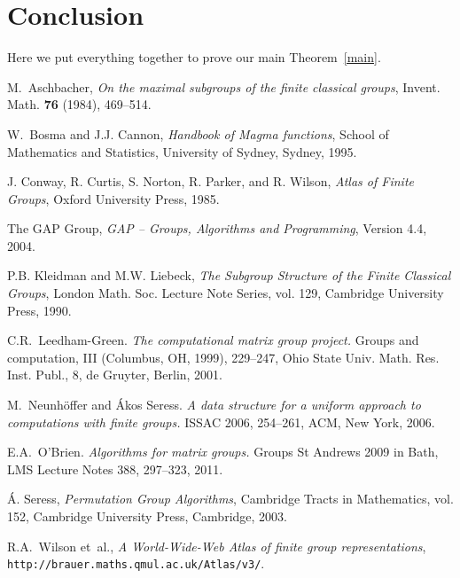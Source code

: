 \documentclass[a4paper,11pt]{article}
\begin{document}
\section{Conclusion}

Here we put everything together to prove our main Theorem~\ref{main}.

\begin{thebibliography}{999}

M.~Aschbacher, \emph{On the maximal subgroups of the finite classical groups},
  Invent. Math. \textbf{76} (1984), 469--514.
  
W.~Bosma and J.J. Cannon, \emph{Handbook of {{\sc Magma}} functions}, School of
  Mathematics and Statistics, University of Sydney, Sydney, 1995.

J. Conway, R. Curtis, S. Norton, R. Parker, and R. Wilson, \emph{Atlas of
  {F}inite {G}roups}, Oxford University Press, 1985.
  
The {GAP} Group, \emph{{GAP} -- {G}roups, {A}lgorithms and {P}rogramming}, Version 4.4, 2004.

P.B. Kleidman and M.W. Liebeck, \emph{The {S}ubgroup {S}tructure of the
  {F}inite {C}lassical {G}roups}, London Math. Soc. Lecture Note Series, vol.
  129, Cambridge University Press, 1990.

C.R.~Leedham-Green. \emph{The computational matrix group project.}
  Groups and computation, III (Columbus, OH, 1999), 229--247, 
  Ohio State Univ. Math. Res. Inst. Publ., 8, de Gruyter, Berlin, 2001.

M.~Neunh{\"o}ffer and {\'A}kos Seress.
  \emph{A data structure for a uniform approach to computations with finite 
  groups.} ISSAC 2006, 254--261, ACM, New York, 2006. 

E.A.~O'Brien. \emph{Algorithms for matrix groups.}
    Groups St Andrews 2009 in Bath, LMS Lecture Notes 388, 297--323, 2011.

{\'A}. Seress, \emph{Permutation {G}roup {A}lgorithms}, Cambridge
  Tracts in Mathematics, vol. 152, Cambridge University Press, Cambridge, 2003.
  
R.A.~Wilson et~al., \emph{A {W}orld-{W}ide-{W}eb {A}tlas of finite group
  representations}, {\texttt{http://brauer.maths.qmul.ac.uk/Atlas/v3/}}.


\end{thebibliography}
\end{document}
